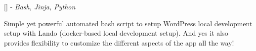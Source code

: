 \documentclass[]{resume}
\begin{document}
           \sectionsep

           [\textbf{\href{https://github.com/Souptik2001/wordpress.setup}{}}] - \textit{Bash, Jinja, Python}

           Simple yet powerful automated bash script to setup WordPress local development setup with Lando (docker-based local development setup). And yes it also provides flexibility to customize the different aspects of the app all the way!

           \sectionsep


     \ 
     
\end{document}
